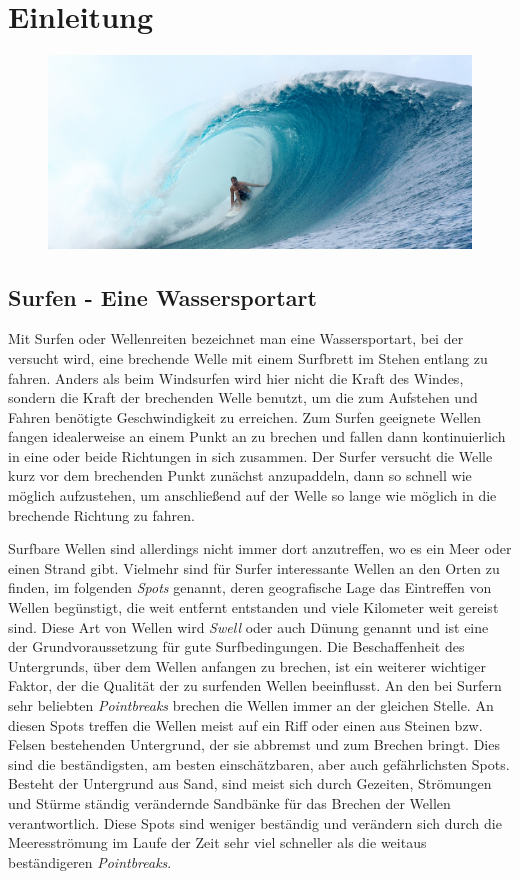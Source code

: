\chapter{Einleitung}

\begin{figure}[h]
  \includegraphics[width=\textwidth]{bilder/intro}
\end{figure}

\section{Surfen - Eine Wassersportart}
Mit Surfen oder Wellenreiten bezeichnet man eine Wassersportart, bei
der versucht wird, eine brechende Welle mit einem Surfbrett im Stehen
entlang zu fahren. Anders als beim Windsurfen wird hier nicht die
Kraft des Windes, sondern die Kraft der brechenden Welle benutzt, um
die zum Aufstehen und Fahren benötigte Geschwindigkeit zu
erreichen. Zum Surfen geeignete Wellen fangen idealerweise an einem
Punkt an zu brechen und fallen dann kontinuierlich in eine oder beide
Richtungen in sich zusammen. Der Surfer versucht die Welle kurz vor
dem brechenden Punkt zunächst anzupaddeln, dann so schnell wie möglich
aufzustehen, um anschließend auf der Welle so lange wie möglich in die
brechende Richtung zu fahren.

Surfbare Wellen sind allerdings nicht immer dort anzutreffen, wo es
ein Meer oder einen Strand gibt. Vielmehr sind für Surfer interessante
Wellen an den Orten zu finden, im folgenden \textit{Spots} genannt,
deren geografische Lage das Eintreffen von Wellen begünstigt, die weit
entfernt entstanden und viele Kilometer weit gereist sind. Diese Art
von Wellen wird \textit{Swell} oder auch Dünung genannt und ist eine
der Grundvoraussetzung für gute Surfbedingungen. Die Beschaffenheit
des Untergrunds, über dem Wellen anfangen zu brechen, ist ein weiterer
wichtiger Faktor, der die Qualität der zu surfenden Wellen
beeinflusst. An den bei Surfern sehr beliebten \textit{Pointbreaks}
brechen die Wellen immer an der gleichen Stelle. An diesen Spots
treffen die Wellen meist auf ein Riff oder einen aus Steinen
bzw. Felsen bestehenden Untergrund, der sie abbremst und zum Brechen
bringt. Dies sind die beständigsten, am besten einschätzbaren, aber
auch gefährlichsten Spots. Besteht der Untergrund aus Sand, sind meist
sich durch Gezeiten, Strömungen und Stürme ständig verändernde
Sandbänke für das Brechen der Wellen verantwortlich. Diese Spots sind
weniger beständig und verändern sich durch die Meeresströmung im Laufe
der Zeit sehr viel schneller als die weitaus beständigeren
\textit{Pointbreaks}.

